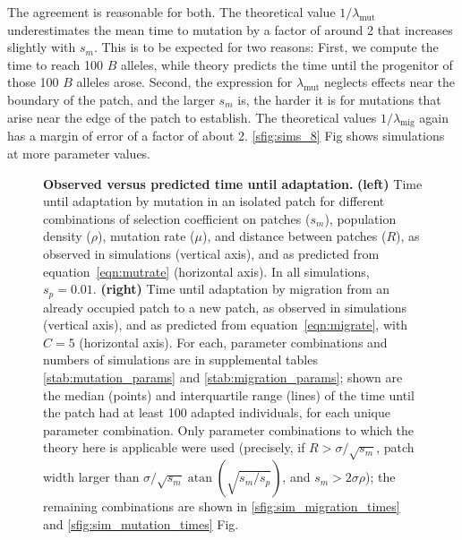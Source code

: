 \documentclass[10pt,letterpaper]{article}
\DeclareMathOperator{\atan}{atan}
\newcommand{\migrate}{\lambda_\text{mig}}
\newcommand{\mutrate}{\lambda_\text{mut}}
\begin{document}
The agreement is reasonable for both.
The theoretical value $1/\mutrate$ underestimates the mean time to mutation
by a factor of around 2 that increases slightly with $s_m$.
This is to be expected for two reasons:
First, we compute the time to reach 100 $B$ alleles, while theory predicts
the time until the progenitor of those 100 $B$ alleles arose.
Second, the expression for $\mutrate$ neglects effects near the boundary of the patch,
and the larger $s_m$ is, 
the harder it is for mutations that arise near the edge of the patch to establish.
The theoretical values $1/\migrate$ again has a margin of error of a factor of about 2.
\ref{sfig:sims_8} Fig shows simulations at more parameter values.


\begin{figure}[ht!]
  \begin{center}
  \end{center}
  \caption{
      \textbf{Observed versus predicted time until adaptation.}
      \textbf{(left)} 
      Time until adaptation by mutation in an isolated patch for different combinations
      of selection coefficient on patches ($s_m$), 
      population density ($\rho$),
      mutation rate ($\mu$),
      and distance between patches ($R$),
      as observed in simulations (vertical axis),
      and as predicted from equation~\eqref{eqn:mutrate} (horizontal axis).
      In all simulations, $s_p=0.01$.
      \textbf{(right)} 
      Time until adaptation by migration from an already occupied patch to a new patch,
      as observed in simulations (vertical axis),
      and as predicted from equation~\eqref{eqn:migrate}, with $C=5$ (horizontal axis).
      For each,
      parameter combinations and numbers of simulations are in supplemental tables \ref{stab:mutation_params} and \ref{stab:migration_params};
      shown are the median (points) and interquartile range (lines)
      of the time until the patch had at least 100 adapted individuals,
      for each unique parameter combination.
      Only parameter combinations to which the theory here is applicable were used
      (precisely, if
      $R > \sigma/\sqrt{s_m}$, 
      patch width larger than $\sigma/\sqrt{s_m} \atan(\sqrt{s_m/s_p})$, 
      and $s_m > 2 \sigma \rho$);
      the remaining combinations are shown in 
      \ref{sfig:sim_migration_times} and \ref{sfig:sim_mutation_times} Fig.
  }   \label{fig:sim_times}
\end{figure}
\end{document}
